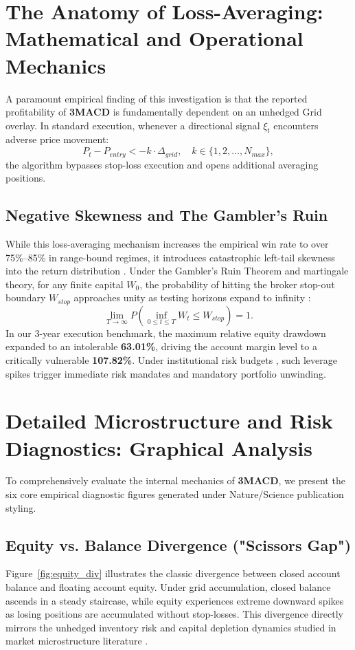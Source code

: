 \documentclass[11pt,a4paper]{article}
\begin{document}
\section{The Anatomy of Loss-Averaging: Mathematical and Operational Mechanics}
A paramount empirical finding of this investigation is that the reported profitability of \textbf{3MACD} is fundamentally dependent on an unhedged Grid overlay. In standard execution, whenever a directional signal $\xi_t$ encounters adverse price movement:
\begin{equation}
P_t - P_{entry} < -k \cdot \Delta_{grid}, \quad k \in \{1, 2, \dots, N_{max}\},
\end{equation}
the algorithm bypasses stop-loss execution and opens additional averaging positions. 

\subsection{Negative Skewness and The Gambler's Ruin}
While this loss-averaging mechanism increases the empirical win rate to over 75\%--85\% in range-bound regimes, it introduces catastrophic left-tail skewness into the return distribution \cite{bouchaud2003theory, cont2001empirical}. Under the Gambler's Ruin Theorem and martingale theory, for any finite capital $W_0$, the probability of hitting the broker stop-out boundary $W_{stop}$ approaches unity as testing horizons expand to infinity \cite{bouchaud2009markets}:
\begin{equation}
\lim_{T \to \infty} P\left(\inf_{0 \le t \le T} W_t \le W_{stop}\right) = 1.
\end{equation}
In our 3-year execution benchmark, the maximum relative equity drawdown expanded to an intolerable \textbf{63.01\%}, driving the account margin level to a critically vulnerable \textbf{107.82\%}. Under institutional risk budgets \cite{rockafellar2000optimization, shleifer1997limits}, such leverage spikes trigger immediate risk mandates and mandatory portfolio unwinding.


\section{Detailed Microstructure and Risk Diagnostics: Graphical Analysis}
To comprehensively evaluate the internal mechanics of \textbf{3MACD}, we present the six core empirical diagnostic figures generated under Nature/Science publication styling.

\subsection{Equity vs. Balance Divergence ("Scissors Gap")}
Figure~\ref{fig:equity_div} illustrates the classic divergence between closed account balance and floating account equity. Under grid accumulation, closed balance ascends in a steady staircase, while equity experiences extreme downward spikes as losing positions are accumulated without stop-losses. This divergence directly mirrors the unhedged inventory risk and capital depletion dynamics studied in market microstructure literature \cite{shleifer1997limits, bouchaud2009markets}.
\end{document}
